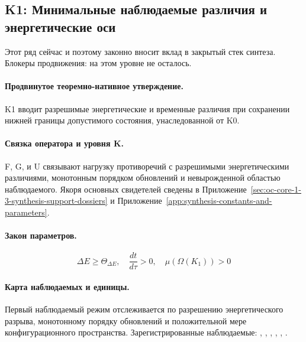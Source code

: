 \subsection{K1: Минимальные наблюдаемые различия и энергетические оси}
\label{sec:oc-core-1-3-synthesis-k1}
Этот ряд сейчас  и поэтому законно вносит вклад в закрытый стек синтеза.
Блокеры продвижения: на этом уровне не осталось.

\paragraph{Продвинутое теоремно-нативное утверждение.}
K1 вводит разрешимые энергетические и временные различия при сохранении нижней границы допустимого состояния, унаследованной от K0.

\paragraph{Связка оператора и уровня K.}
F, G, и U связывают нагрузку противоречий с разрешимыми энергетическими различиями, монотонным порядком обновлений и невырожденной областью наблюдаемого.
Якоря основных свидетелей сведены в Приложение~\ref{sec:oc-core-1-3-synthesis-support-dossiers} и Приложение~\ref{app:synthesis-constants-and-parameters}.

\paragraph{Закон параметров.}
\[
\Delta E \geq \Theta_{\Delta E},\quad \frac{dt}{d\tau} > 0,\quad \mu(\Omega(K_1)) > 0
\]

\paragraph{Карта наблюдаемых и единицы.}
Первый наблюдаемый режим отслеживается по разрешению энергетического разрыва, монотонному порядку обновлений и положительной мере конфигурационного пространства.
Зарегистрированные наблюдаемые: , \allowbreak {}, \allowbreak {}, \allowbreak {}, \allowbreak {}, \allowbreak {}.

